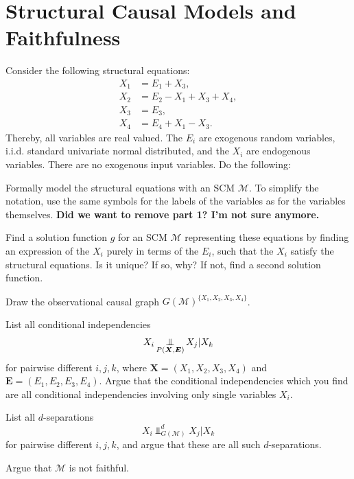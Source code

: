 \documentclass[11pt,a4paper]{article}
\begin{document}
\section{Structural Causal Models and Faithfulness}

Consider the following structural equations:
\begin{align*}
  X_1 & = E_1 + X_3, \\
  X_2 & = E_2 - X_1 + X_3 + X_4, \\ 
  X_3 & = E_3,  \\
  X_4 & = E_4 + X_1 - X_3. 
\end{align*}
Thereby, all variables are real valued.
The $E_i$ are exogenous random variables, i.i.d. standard univariate normal distributed, and the $X_i$ are endogenous variables.
There are no exogenous input variables.
Do the following:
\begin{enumerate}
  \item  {\color{magenta}Formally model the structural equations with an SCM $\mathcal{M}$.
    To simplify the notation, use the same symbols for the labels of the variables as for the variables themselves.}
\textbf{Did we want to remove part 1? I'm not sure anymore.}
  \item  Find a solution function $g$ for an SCM $\mathcal{M}$ representing these equations by finding an expression of the $X_i$ purely in terms of the $E_i$, such that the $X_i$ satisfy the structural equations. 
    Is it unique? If so, why? If not, find a second solution function. 
  \item  Draw the observational causal graph $G(\mathcal{M})^{\{X_1, X_2, X_3, X_4\}}$.
    {\color{magenta}
  \item  List all conditional independencies 
    \begin{equation*}
      X_i \operatorname*{\perp\mkern-11mu\perp}_{P(\boldsymbol{X}, \boldsymbol{E})} X_j | X_k
    \end{equation*} 
    for pairwise different $i, j, k$, where $\boldsymbol{X} = (X_1, X_2, X_3, X_4)$ and $\boldsymbol{E} = (E_1, E_2, E_3, E_4)$. 
    Argue that the conditional independencies which you find are all conditional independencies involving only single variables $X_i$.
  \item  List all $d$-separations 
    \begin{equation*}
      X_i \Perp^d_{G(\mathcal{M})} X_j | X_k
    \end{equation*}
    for pairwise different $i, j, k$, and argue that these are all such $d$-separations.
  \item  Argue that $\mathcal{M}$ is not faithful.
}
\end{enumerate}
\end{document}
